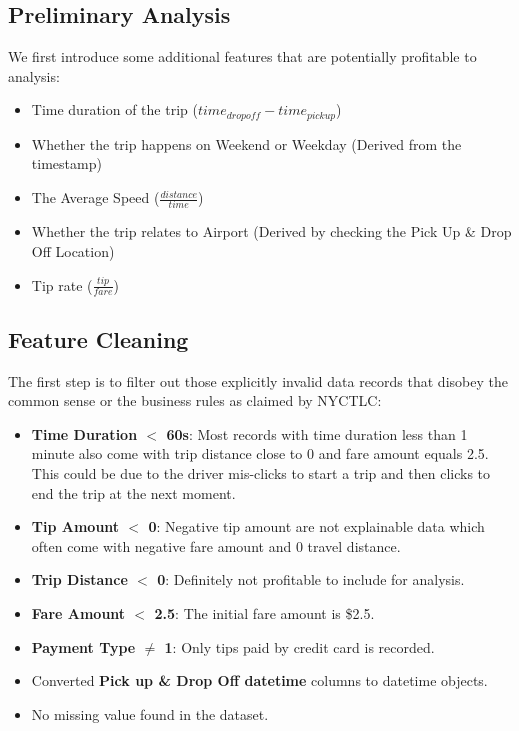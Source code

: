\documentclass[11pt]{article}
\begin{document}
\subsection{Preliminary Analysis}
We first introduce some additional features that are potentially profitable to analysis:\\
\begin{itemize} 
    \item Time duration of the trip ($time_{drop off} - time_{pick up}$)
    \item Whether the trip happens on Weekend or Weekday (Derived from the timestamp)
    \item The Average Speed ($\frac{distance}{time}$)
    \item Whether the trip relates to Airport (Derived by checking the Pick Up \& Drop Off Location)
    \item Tip rate ($\frac{tip}{fare}$)
\end{itemize} 


\subsection{Feature Cleaning}
The first step is to filter out those  explicitly invalid data records that disobey the common sense or the business rules as claimed by NYCTLC\cite{2}:\\

\begin{itemize}
    
    \item \textbf{Time Duration $<$ 60s}: Most records with time duration less than 1 minute also come with trip distance close to 0 and fare amount equals 2.5. This could be due to the driver mis-clicks to start a trip and then clicks to end the trip at the next moment.
    \item \textbf{Tip Amount $<$ 0}: Negative tip amount are not explainable data which often come with negative fare amount and 0 travel distance.
    \item \textbf{Trip Distance $<$ 0}: Definitely not profitable to include for analysis.
    \item \textbf{Fare Amount $<$ 2.5}: The initial fare amount is \$2.5.
    \item \textbf{Payment Type $\neq$ 1}: Only tips paid by credit card is recorded.
    \item Converted \textbf{Pick up \& Drop Off datetime} columns to datetime objects.
    \item No missing value found in the dataset.
\end{itemize}    
 
\end{document}
